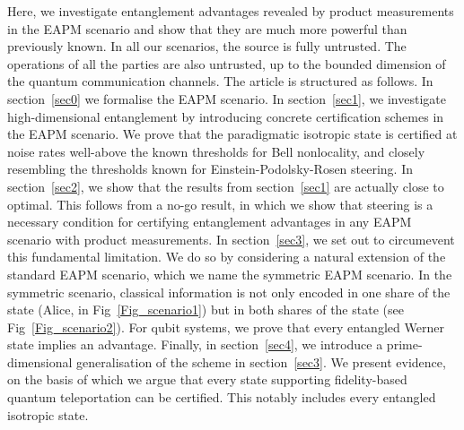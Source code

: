 \documentclass[aps,superscriptaddress,twocolumn,twoside,floatfix,pra,nofootinbib,a4paper]{revtex4-2}
\begin{document}
Here, we investigate entanglement advantages revealed by product measurements in the EAPM scenario and show that they are much more powerful than previously known. {In all our scenarios,  the source is fully untrusted. The operations of all the parties are also untrusted, up to the bounded dimension of the quantum communication channels.} The article is structured as follows. In section~\ref{sec0} we formalise the EAPM scenario. In section~\ref{sec1}, we investigate high-dimensional entanglement by introducing concrete certification schemes in the EAPM scenario. We prove that the paradigmatic isotropic state is certified at noise rates well-above the known thresholds for Bell nonlocality, and closely resembling the thresholds known for Einstein-Podolsky-Rosen steering.  In section~\ref{sec2}, we show that the results from section~\ref{sec1} are actually close to optimal. This follows from a no-go result, in which we show that steering is a necessary condition for certifying entanglement advantages in any EAPM scenario with product measurements. In section~\ref{sec3}, we set out to circumevent this fundamental limitation. We do so by considering a natural extension of the standard EAPM scenario, which we name the symmetric EAPM scenario. In the symmetric scenario, classical information is not only encoded in one share of the state (Alice, in Fig~\ref{Fig_scenario1}) but in both shares of the state (see Fig~\ref{Fig_scenario2}). For qubit systems, we prove that every entangled Werner state implies an advantage. Finally, in section~\ref{sec4}, we introduce a prime-dimensional generalisation of the scheme in section~\ref{sec3}. We present evidence, on the basis of which we argue that every state supporting fidelity-based quantum teleportation can be certified. This notably includes every entangled isotropic state.
\end{document}

